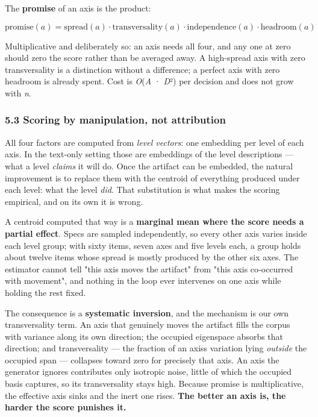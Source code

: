 \documentclass[
  10pt,
]{article}
\theoremstyle{plain}
\theoremstyle{definition}
\begin{document}
The \textbf{promise} of an axis is the product:

\[
\mathrm{promise}(a) = \mathrm{spread}(a)\cdot\mathrm{transversality}(a)\cdot\mathrm{independence}(a)\cdot\mathrm{headroom}(a)
\]

Multiplicative and deliberately so: an axis needs all four, and any one
at zero should zero the score rather than be averaged away. A
high-spread axis with zero transversality is a distinction without a
difference; a perfect axis with zero headroom is already spent. Cost is
\emph{O}(\textbar{}\emph{A}\textbar{} · \emph{D}²) per decision and does
not grow with \emph{n}.

\subsubsection{5.3 Scoring by manipulation, not
attribution}\label{53-scoring-by-manipulation-not-attribution}

All four factors are computed from \emph{level vectors}: one embedding
per level of each axis. In the text-only setting those are embeddings of
the level descriptions --- what a level \emph{claims} it will do. Once
the artifact can be embedded, the natural improvement is to replace them
with the centroid of everything produced under each level: what the
level \emph{did}. That substitution is what makes the scoring empirical,
and on its own it is wrong.

A centroid computed that way is a \textbf{marginal mean where the score
needs a partial effect}. Specs are sampled independently, so every other
axis varies inside each level group; with sixty items, seven axes and
five levels each, a group holds about twelve items whose spread is
mostly produced by the other six axes. The estimator cannot tell "this
axis moves the artifact" from "this axis co-occurred with movement", and
nothing in the loop ever intervenes on one axis while holding the rest
fixed.

The consequence is a \textbf{systematic inversion}, and the mechanism is
our own transversality term. An axis that genuinely moves the artifact
fills the corpus with variance along its own direction; the occupied
eigenspace absorbs that direction; and transversality --- the fraction
of an axis\textquotesingle s variation lying \emph{outside} the occupied
span --- collapses toward zero for precisely that axis. An axis the
generator ignores contributes only isotropic noise, little of which the
occupied basis captures, so its transversality stays high. Because
promise is multiplicative, the effective axis sinks and the inert one
rises. \textbf{The better an axis is, the harder the score punishes it.}
\end{document}
